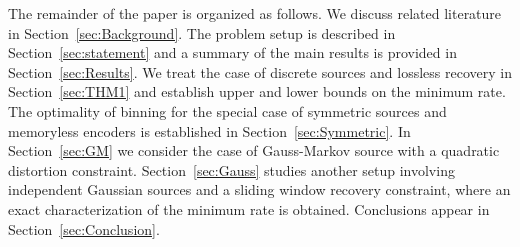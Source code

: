 \documentclass[journal, twocolumn, 10pt]{IEEEtran}
\begin{document}
%
%
%
%
The remainder of the paper is organized as follows.  We discuss related literature  in Section~\ref{sec:Background}. The problem setup is described in Section~\ref{sec:statement} and a summary of the main results is provided in Section~\ref{sec:Results}. We treat the case of discrete sources and lossless recovery in Section~\ref{sec:THM1} and establish upper and lower bounds on the minimum rate. The optimality of binning for the special case of symmetric sources and memoryless encoders is established in Section~\ref{sec:Symmetric}. In Section~\ref{sec:GM} we consider the case of Gauss-Markov source with a quadratic distortion constraint. Section~\ref{sec:Gauss} studies another setup involving independent Gaussian sources and a sliding window recovery constraint, where an exact characterization of the minimum rate is obtained. Conclusions appear in Section~\ref{sec:Conclusion}. 
\end{document}
